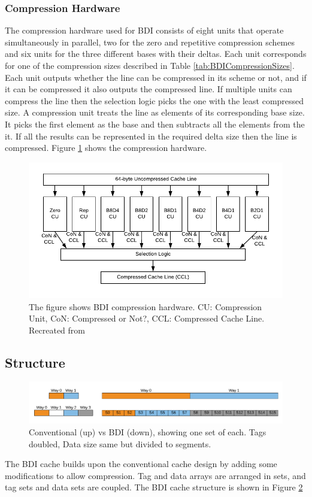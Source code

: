 \subsubsection{Compression Hardware}
\label{sssec:BDICompressionHardware}
The compression hardware used for BDI consists of eight units that operate simultaneously in parallel, two for the zero and repetitive compression schemes and six units for the three different bases with their deltas. Each unit corresponds for one of the compression sizes described in Table \ref{tab:BDICompressionSizes}. Each unit outputs whether the line can be compressed in its scheme or not, and if it can be compressed it also outputs the compressed line. If multiple units can compress the line then the selection logic picks the one with the least compressed size.
A compression unit treats the line as elements of its corresponding base size. It picks the first element as the base and then subtracts all the elements from the it. If all the results can be represented in the required delta size then the line is compressed. Figure \ref{fig:BDIHardware} shows the compression hardware.
\begin{figure}
    \includegraphics[width=\textwidth]{BDIHardware.pdf}
    \caption[BDI Compression Hardware]{The figure shows BDI compression hardware. CU: Compression Unit, CoN: Compressed or Not?, CCL: Compressed Cache Line. Recreated from \protect\cite{bdi}}
    \label{fig:BDIHardware}
\end{figure}

\subsection{Structure}
\label{ssec:BDIStructure}
\begin{figure}
    \includegraphics[width=\textwidth]{BDI.pdf}
    \caption[BDI Cache]{Conventional (up) vs BDI (down), showing one set of each. Tags doubled, Data size same but divided to segments.}
    \label{fig:BDI}
\end{figure}
The BDI cache builds upon the conventional cache design by adding some modifications to allow compression. Tag and data arrays are arranged in sets, and tag sets and data sets are coupled. The BDI cache structure is shown in Figure \ref{fig:BDI}
